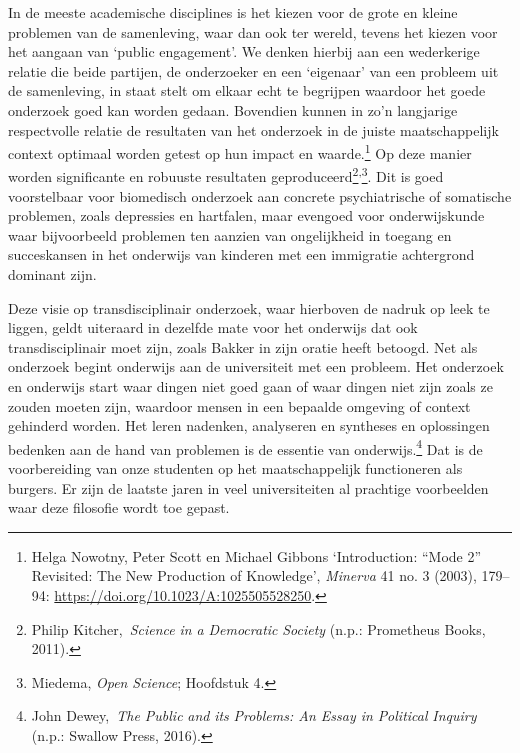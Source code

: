 \documentclass[smallauthor, chapterhaspagenum, nochapterinheader, pagenuminheader,  bigchapnum,medium2, tocpages,  garamond, titleinheader]{jote-book}
\begin{document}
	In de meeste academische disciplines is het kiezen voor de grote en kleine problemen van de samenleving, waar dan ook ter wereld, tevens het kiezen voor het aangaan van ‘public engagement'. We denken hierbij aan een wederkerige relatie die beide partijen, de onderzoeker en een ‘eigenaar' van een probleem uit de samenleving, in staat stelt om elkaar echt te begrijpen waardoor het goede onderzoek goed kan worden gedaan. Bovendien kunnen in zo'n langjarige respectvolle relatie de resultaten van het onderzoek in de juiste maatschappelijk context optimaal worden getest op hun impact en waarde.\footnote{Helga Nowotny, Peter Scott en Michael Gibbons ‘Introduction: “Mode 2” Revisited: The New Production of Knowledge', \emph{Minerva }41 no. 3 (2003), 179--94: \href{https://doi.org/10.1023/A:1025505528250}{https://doi.org/10.1023/A:1025505528250}.} Op deze manier worden significante en robuuste resultaten geproduceerd\footnote{Philip Kitcher, \emph{Science}\emph{ in a }\emph{Democratic}\emph{ Society}\emph{ }(n.p.: Prometheus Books, 2011).}\textsuperscript{,}\footnote{Miedema, \emph{Open }\emph{Science}; Hoofdstuk 4.}. Dit is goed voorstelbaar voor biomedisch onderzoek aan concrete psychiatrische of somatische problemen, zoals depressies en hartfalen, maar evengoed voor onderwijskunde waar bijvoorbeeld problemen ten aanzien van ongelijkheid in toegang en succeskansen in het onderwijs van kinderen met een immigratie achtergrond dominant zijn.



	Deze visie op transdisciplinair onderzoek, waar hierboven de nadruk op leek te liggen, geldt uiteraard in dezelfde mate voor het onderwijs dat ook transdisciplinair moet zijn, zoals Bakker in zijn oratie heeft betoogd. Net als onderzoek begint onderwijs aan de universiteit met een probleem. Het onderzoek en onderwijs start waar dingen niet goed gaan of waar dingen niet zijn zoals ze zouden moeten zijn, waardoor mensen in een bepaalde omgeving of context gehinderd worden. Het leren nadenken, analyseren en syntheses en oplossingen bedenken aan de hand van problemen is de essentie van onderwijs.\footnote{John Dewey, \emph{The Public }\emph{and}\emph{ }\emph{its}\emph{ }\emph{Problems}\emph{: An Essay in }\emph{Political}\emph{ }\emph{Inquiry}\emph{ }(n.p.: Swallow Press, 2016).} Dat is de voorbereiding van onze studenten op het maatschappelijk functioneren als burgers. Er zijn de laatste jaren in veel universiteiten al prachtige voorbeelden waar deze filosofie wordt toe gepast.
\end{document}
